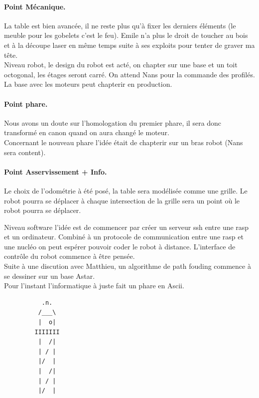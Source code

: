 \documentclass[a4paper,10pt]{report}
\begin{document}
\begin{spacing}{1.5}
\paragraph*{Point Mécanique.}
La table est bien avancée, il ne reste plus qu'à fixer les derniers éléments (le
meuble pour les gobelets c'est le feu). Emile n'a plus le droit de toucher au
bois et à la découpe laser en même temps suite à ses exploits pour tenter de
graver ma tête. \\
Niveau robot, le design du robot est acté, on chapter sur une base et un toit
octogonal, les étages seront carré. On attend Nans pour la commande des
profilés. La base avec les moteurs peut chapterir en production.

\paragraph*{Point phare.}
\label{sec:phare}
Nous avons un doute sur l'homologation du premier phare, il sera donc transformé
en canon quand on aura changé le moteur. \\
Concernant le nouveau phare l'idée était de chapterir sur un bras robot (Nans sera
content).

\paragraph*{Point Asservissement + Info.}
Le choix de l'odométrie à été posé, la table sera modélisée comme une grille. Le
robot pourra se déplacer à chaque intersection de la grille sera un point où le
robot pourra se déplacer.\\
\begin{center}
\end{center}
Niveau software l'idée est de commencer par créer un serveur ssh entre une rasp
et un ordinateur. Combiné à un protocole de communication entre une rasp et une
nucléo on peut espérer pouvoir coder le robot à distance. L'interface de
contrôle du robot commence à être pensée. \\
Suite à une discution avec Matthieu, un algorithme de path fouding commence à se
dessiner sur un base Astar.\\ Pour l'instant l'informatique à juste fait un
phare en Ascii.
\newpage
\begin{figure}[!h]
  \center
  \begin{lstlisting}
     .n.
    /___\
    |  o|
   IIIIIII
    |  /|
    | / |
    |/  |
    |  /|
    | / |
    |/  |
  \end{lstlisting}
\end{figure}

\end{spacing}
\end{document}
